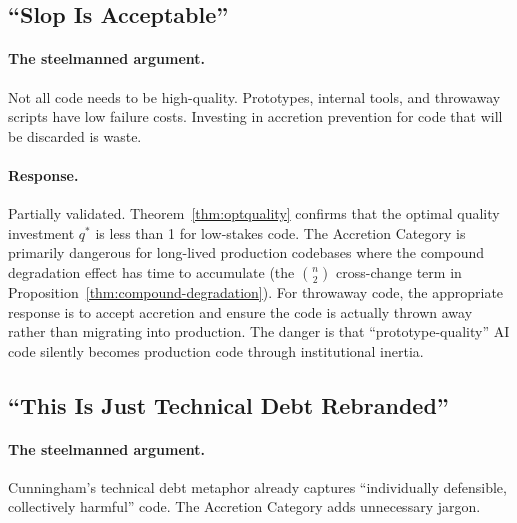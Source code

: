 \documentclass[11pt, a4paper, copyright]{googledeepmind}
\begin{document}
\subsection{``Slop Is Acceptable''}

\paragraph{The steelmanned argument.} Not all code needs to be high-quality. Prototypes, internal tools, and throwaway scripts have low failure costs. Investing in accretion prevention for code that will be discarded is waste.

\paragraph{Response.} Partially validated. Theorem~\ref{thm:optquality} confirms that the optimal quality investment $q^*$ is less than 1 for low-stakes code. The Accretion Category is primarily dangerous for long-lived production codebases where the compound degradation effect has time to accumulate (the $\binom{n}{2}$ cross-change term in Proposition~\ref{thm:compound-degradation}). For throwaway code, the appropriate response is to accept accretion and ensure the code is actually thrown away rather than migrating into production. The danger is that ``prototype-quality'' AI code silently becomes production code through institutional inertia.

\subsection{``This Is Just Technical Debt Rebranded''}

\paragraph{The steelmanned argument.} Cunningham's technical debt metaphor already captures ``individually defensible, collectively harmful'' code. The Accretion Category adds unnecessary jargon.
\end{document}
